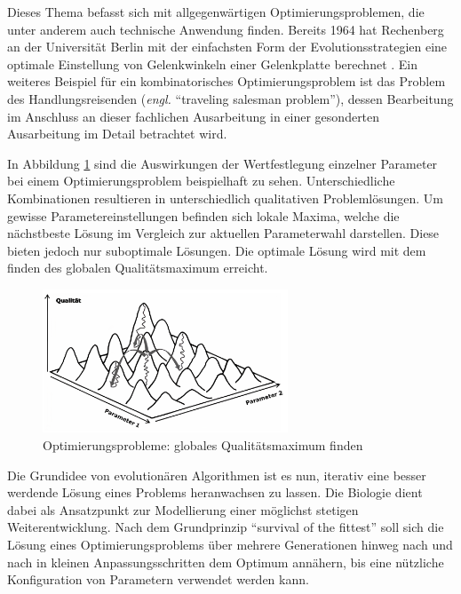 Dieses Thema befasst sich mit allgegenwärtigen Optimierungsproblemen, die unter anderem auch technische Anwendung finden.
Bereits 1964 hat Rechenberg an der Universität Berlin mit der einfachsten Form der Evolutionsstrategien eine optimale Einstellung von Gelenkwinkeln einer Gelenkplatte berechnet \cite{schoeneburg}.
Ein weiteres Beispiel für ein kombinatorisches Optimierungsproblem ist das Problem des Handlungsreisenden (\textit{engl.} \enquote{traveling salesman problem}), dessen Bearbeitung im Anschluss an dieser fachlichen Ausarbeitung in einer gesonderten Ausarbeitung im Detail betrachtet wird.

In Abbildung \ref{fig:lokale_globale_maxima} sind die Auswirkungen der Wertfestlegung einzelner Parameter bei einem Optimierungsproblem beispielhaft zu sehen.
Unterschiedliche Kombinationen resultieren in unterschiedlich qualitativen Problemlösungen.
Um gewisse Parametereinstellungen befinden sich lokale Maxima, welche die nächstbeste Lösung im Vergleich zur aktuellen Parameterwahl darstellen. Diese bieten jedoch nur suboptimale Lösungen. Die optimale Lösung wird mit dem finden des globalen Qualitätsmaximum erreicht.

\begin{figure}[H]
\centering
\includegraphics[width=0.65\textwidth]{img/Evolutionsstrategie_lokale_globale_Maxima.png}
\caption[Optimierungsprobleme: lokale Maxima/Minima finden]{Optimierungsprobleme: globales Qualitätsmaximum finden\protect\footnotemark}
\label{fig:lokale_globale_maxima}
\end{figure}

Die Grundidee von evolutionären Algorithmen ist es nun, iterativ eine besser werdende Lösung eines Problems heranwachsen zu lassen.
Die Biologie dient dabei als Ansatzpunkt zur Modellierung einer möglichst stetigen Weiterentwicklung.
Nach dem Grundprinzip \enquote{survival of the fittest} soll sich die Lösung eines Optimierungsproblems über mehrere Generationen hinweg nach und nach in kleinen Anpassungsschritten dem Optimum annähern, bis eine nützliche Konfiguration von Parametern verwendet werden kann.

